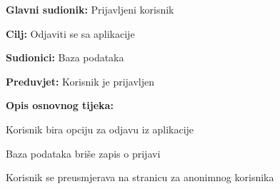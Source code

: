 \noindent {}
\begin{packed_item}

\item \textbf{Glavni sudionik:} Prijavljeni korisnik
\item  \textbf{Cilj:} Odjaviti se sa aplikacije
\item  \textbf{Sudionici:} Baza podataka
\item  \textbf{Preduvjet:} Korisnik je prijavljen
\item  \textbf{Opis osnovnog tijeka:}

\item[] \begin{packed_enum}

    \item Korisnik bira opciju za odjavu iz aplikacije
    \item Baza podataka briše zapis o prijavi
    \item Korisnik se preusmjerava na stranicu za anonimnog korisnika

\end{packed_enum}

\end{packed_item}

